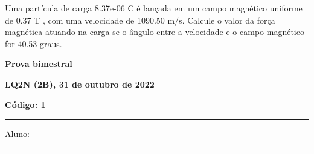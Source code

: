 \documentclass[12pt, addpoints]{exam}
\begin{document}
\begin{questions}
\begin{multicols*}{2}
\begin{oneparchoices}
\end{oneparchoices}
\question[20] Uma partícula de carga 8.37e-06 C é lançada em um campo magnético uniforme de    0.37 T , com uma velocidade de 1090.50 m/s. Calcule o valor da força magnética atuando na carga se o ângulo entre a velocidade e o campo magnético for   40.53 graus.

\begin{oneparchoices}
\end{oneparchoices}
\end{multicols*}
\end{questions}
\newpage
        \begin{minipage}[b]{0.75\linewidth}
            \begin{flushleft}
                {\bf \large Prova bimestral}
            \end{flushleft}
            \begin{flushleft}
                {\bf \large LQ2N (2B), 31 de outubro de 2022}
            \end{flushleft}
        \end{minipage}
        \begin{minipage}[b]{0.20\linewidth}
            \begin{flushright}
                {\bf \large Código: 1}
            \end{flushright}
        \end{minipage}
        \vspace{0.5cm} \hrule \vspace{0.5cm}
        \begin{minipage}{0.75\linewidth}
            Aluno:
        \end{minipage}
        \vspace{0.5cm} \hrule \vspace{0.5cm}
\end{document}
